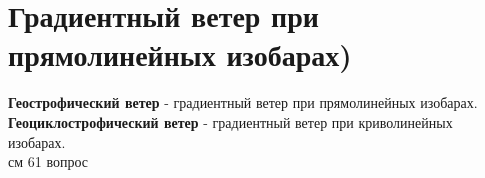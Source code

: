
\section{Градиентный ветер при прямолинейных изобарах)}
\textbf{Геострофический ветер} - градиентный ветер при прямолинейных изобарах.\\
\textbf{Геоциклострофический ветер} - градиентный ветер при криволинейных изобарах.\\
см 61 вопрос